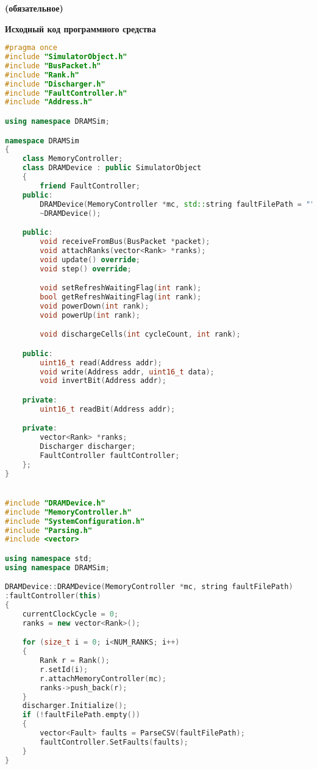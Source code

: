 \begin{center}
\vspace{-1em}
\textbf{ (обязательное)}

\textbf{Исходный код программного средства}
\end{center}


\begin{lstlisting}[language=C++, style=cplusplusstyle]
#pragma once
#include "SimulatorObject.h"
#include "BusPacket.h"
#include "Rank.h"
#include "Discharger.h"
#include "FaultController.h"
#include "Address.h"

using namespace DRAMSim;

namespace DRAMSim
{
	class MemoryController;
	class DRAMDevice : public SimulatorObject
	{
		friend FaultController;
	public:
		DRAMDevice(MemoryController *mc, std::string faultFilePath = "");
		~DRAMDevice();

	public:
		void receiveFromBus(BusPacket *packet);
		void attachRanks(vector<Rank> *ranks);
		void update() override;
		void step() override;

		void setRefreshWaitingFlag(int rank);
		bool getRefreshWaitingFlag(int rank);
		void powerDown(int rank);
		void powerUp(int rank);

		void dischargeCells(int cycleCount, int rank);

	public:
		uint16_t read(Address addr);
		void write(Address addr, uint16_t data);
		void invertBit(Address addr);

	private:
		uint16_t readBit(Address addr);

	private:
		vector<Rank> *ranks;
		Discharger discharger;
		FaultController faultController;
	};
}


#include "DRAMDevice.h"
#include "MemoryController.h"
#include "SystemConfiguration.h"
#include "Parsing.h"
#include <vector>

using namespace std;
using namespace DRAMSim;

DRAMDevice::DRAMDevice(MemoryController *mc, string faultFilePath)
:faultController(this)
{
	currentClockCycle = 0;
	ranks = new vector<Rank>();

	for (size_t i = 0; i<NUM_RANKS; i++)
	{
		Rank r = Rank();
		r.setId(i);
		r.attachMemoryController(mc);
		ranks->push_back(r);
	}
	discharger.Initialize();
	if (!faultFilePath.empty())
	{
		vector<Fault> faults = ParseCSV(faultFilePath);
		faultController.SetFaults(faults);
	}
}


\end{lstlisting}
